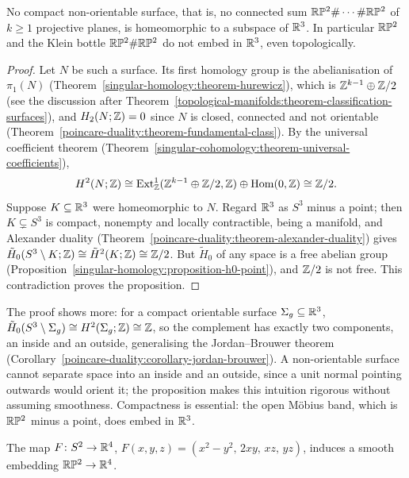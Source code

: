\begin{proposition}\label{smooth-manifolds:proposition-no-embedding-r3}
No compact non-orientable surface, that is, no connected sum $\mathbb{R}\mathbb{P}^2 \# \cdots \# \mathbb{R}\mathbb{P}^2$ of $k \geq 1$ projective planes, is homeomorphic to a subspace of $\mathbb{R}^3$. In particular $\mathbb{R}\mathbb{P}^2$ and the Klein bottle
$\mathbb{R}\mathbb{P}^2 \# \mathbb{R}\mathbb{P}^2$ do not embed in $\mathbb{R}^3$, even topologically.
\end{proposition}

\begin{proof}
Let $N$ be such a surface. Its first homology group is the abelianisation of $\pi_1(N)$ (Theorem~\ref{singular-homology:theorem-hurewicz}), which is $\mathbb{Z}^{k-1} \oplus \mathbb{Z}/2$ (see the discussion after
Theorem~\ref{topological-manifolds:theorem-classification-surfaces}), and $H_2(N; \mathbb{Z}) = 0$ since $N$ is closed, connected and not orientable (Theorem~\ref{poincare-duality:theorem-fundamental-class}). By the universal
coefficient theorem (Theorem~\ref{singular-cohomology:theorem-universal-coefficients}),
\[
H^2(N; \mathbb{Z}) \cong \operatorname{Ext}^1_{\mathbb{Z}}(\mathbb{Z}^{k-1} \oplus \mathbb{Z}/2, \mathbb{Z}) \oplus \operatorname{Hom}(0, \mathbb{Z}) \cong \mathbb{Z}/2 .
\]
Suppose $K \subseteq \mathbb{R}^3$ were homeomorphic to $N$. Regard $\mathbb{R}^3$ as $S^3$ minus a point; then $K \subsetneq S^3$ is compact, nonempty and locally contractible, being a manifold, and Alexander duality
(Theorem~\ref{poincare-duality:theorem-alexander-duality}) gives $\tilde{H}_0(S^3 \setminus K; \mathbb{Z}) \cong \tilde{H}^2(K; \mathbb{Z}) \cong \mathbb{Z}/2$. But $\tilde{H}_0$ of any space is a free abelian group
(Proposition~\ref{singular-homology:proposition-h0-point}), and $\mathbb{Z}/2$ is not free. This contradiction proves the proposition.
\end{proof}

The proof shows more: for a compact orientable surface $\Sigma_g \subseteq \mathbb{R}^3$, $\tilde{H}_0(S^3 \setminus \Sigma_g) \cong H^2(\Sigma_g; \mathbb{Z}) \cong \mathbb{Z}$, so the complement has exactly two components, an inside and an outside,
generalising the Jordan--Brouwer theorem (Corollary~\ref{poincare-duality:corollary-jordan-brouwer}). A non-orientable surface cannot separate space into an inside and an outside, since a unit normal pointing outwards
would orient it; the proposition makes this intuition rigorous without assuming smoothness. Compactness is essential: the open M\"obius band, which is $\mathbb{R}\mathbb{P}^2$ minus a point, does embed in $\mathbb{R}^3$.

\begin{proposition}\label{smooth-manifolds:proposition-rp2-r4}
The map $F \colon S^2 \to \mathbb{R}^4$, $F(x, y, z) = (x^2 - y^2, \, 2xy, \, xz, \, yz)$, induces a smooth embedding $\mathbb{R}\mathbb{P}^2 \to \mathbb{R}^4$.
\end{proposition}

